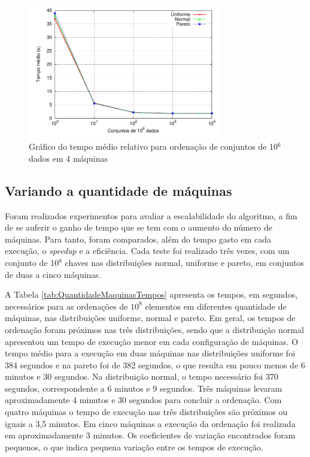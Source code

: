 \begin{figure}[htb]
\centering
\includegraphics[width=0.75\textwidth]{figuras/DadosOverhead.pdf}
\caption{Gráfico do tempo médio relativo para ordenação de conjuntos de 10$^6$ dados em 4 máquinas}
\label{fig:DadosOverhead}
\end{figure}


\subsection{Variando a quantidade de máquinas}

Foram realizados experimentos para avaliar a escalabilidade do algoritmo, a fim de se auferir o ganho de tempo que se tem com o aumento do número de máquinas. Para tanto, foram comparados, além do tempo gasto em cada execução, o \textit{speedup} e a eficiência. Cada teste foi realizado três vezes, com um conjunto de 10$^8$ chaves nas distribuições normal, uniforme e pareto, em conjuntos de duas a cinco máquinas. 

A Tabela \ref{tab:QuantidadeMaquinasTempos} apresenta os tempos, em segundos, necessários para as ordenações de $10^8$ elementos em diferentes quantidade de máquinas, nas distribuições uniforme, normal e pareto. Em geral, os tempos de ordenação foram próximos nas três distribuições, sendo que a distribuição normal apresentou um tempo de execução menor em cada configuração de máquinas. 
O tempo médio para a execução em duas máquinas nas distribuições uniforme foi 384 segundos e na pareto foi de 382 segundos, o que resulta em pouco menos de 6 minutos e 30 segundos. Na distribuição normal, o tempo necessário foi 370 segundos, correspondente a 6 minutos e 9 segundos. 
Três máquinas levaram aproximadamente 4 minutos e 30 segundos para concluir a ordenação. 
Com quatro máquinas o tempo de execução nas três distribuições são próximos ou iguais a 3,5 minutos. 
Em cinco máquinas a execução da ordenação foi realizada em aproximadamente 3 minutos. 
Os coeficientes de variação encontrados foram pequenos, o que indica pequena variação entre os tempos de execução.

